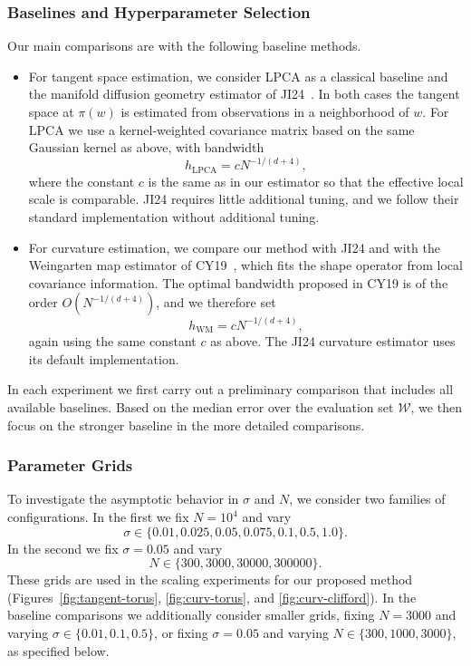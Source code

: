 \documentclass[11pt]{article}
\theoremstyle{plain}
\theoremstyle{definition}
\begin{document}
\subsubsection{Baselines and Hyperparameter Selection}
Our main comparisons are with the following baseline methods.
\begin{itemize}
  \item For tangent space estimation, we consider LPCA as a classical baseline and the manifold diffusion geometry estimator of JI24~\citep{Jones2025ManifoldDG}. In both cases the tangent space at $\pi(w)$ is estimated from observations in a neighborhood of $w$. For LPCA we use a kernel-weighted covariance matrix based on the same Gaussian kernel as above, with bandwidth
    \[
      h_{\mathrm{LPCA}}
      = c N^{-1/(d+4)},
    \]
    where the constant $c$ is the same as in our estimator so that the effective local scale is comparable. JI24 requires little additional tuning, and we follow their standard implementation without additional tuning.

  \item For curvature estimation, we compare our method with JI24 and with the Weingarten map estimator of CY19~\citep{Cao2019EfficientWM}, which fits the shape operator from local covariance information. The optimal bandwidth proposed in CY19 is of the order $O(N^{-1/(d+4)})$, and we therefore set
    \[
      h_{\mathrm{WM}}
      = c N^{-1/(d+4)},
    \]
    again using the same constant $c$ as above. The JI24 curvature estimator uses its default implementation.
\end{itemize}
In each experiment we first carry out a preliminary comparison that includes all available baselines. Based on the median error over the evaluation set $\mathcal W$, we then focus on the stronger baseline in the more detailed comparisons.

\subsubsection{Parameter Grids}
To investigate the asymptotic behavior in $\sigma$ and $N$, we consider two families of configurations. In the first we fix $N = 10^4$ and vary
\[
   \sigma \in \{0.01, 0.025, 0.05, 0.075, 0.1, 0.5, 1.0\}.
\]
In the second we fix $\sigma = 0.05$ and vary
\[
   N \in \{300, 3000, 30000, 300000\}.
\]
These grids are used in the scaling experiments for our proposed method (Figures~\ref{fig:tangent-torus}, \ref{fig:curv-torus}, and \ref{fig:curv-clifford}). In the baseline comparisons we additionally consider smaller grids, fixing $N = 3000$ and varying $\sigma \in \{0.01, 0.1, 0.5\}$, or fixing $\sigma = 0.05$ and varying $N \in \{300, 1000, 3000\}$, as specified below.
\end{document}
